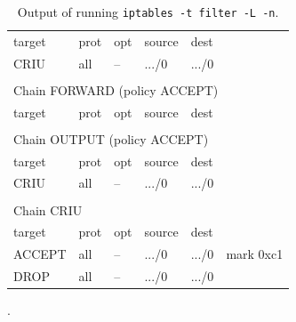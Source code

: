 \documentclass[9pt,    %
    english,            %
    xcolor=table,       %
    envcountsect,        %
    aspectratio=169     %
]{beamer}
\begin{document}
\begin{frame}
\begin{columns}[t]
\begin{column}{.40\textwidth}
\begin{table}
{\begin{tabular}{p{0.7cm}p{0.3cm}p{0.3cm}p{0.5cm}p{0.5cm}p{1.2cm}}
                    target & prot & opt & source & dest & \\
                    CRIU & all & -- & .../0 & .../0 & \\
                    & & & & & \\
                    \multicolumn{6}{l}{Chain FORWARD (policy ACCEPT)} \\
                    target & prot & opt & source & dest & \\
                    & & & & & \\
                    \multicolumn{6}{l}{Chain OUTPUT (policy ACCEPT)} \\
                    target & prot & opt & source & dest & \\
                    CRIU & all & -- & .../0 & .../0 & \\
                    & & & & & \\
                    \multicolumn{6}{l}{Chain CRIU} \\
                    target & prot & opt & source & dest & \\
                    ACCEPT & all & -- & .../0 & .../0 & mark 0xc1 \\
                    DROP & all & -- & .../0 & .../0 & \\
                \end{tabular}
                }
                \caption{Output of running \texttt{iptables -t filter -L -n}.\label{table:filter}}.
            \end{table}
        \end{column}
    \end{columns}
\end{frame}
\end{document}

